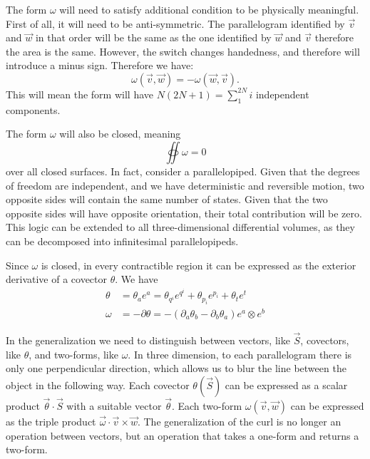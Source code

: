 \documentclass[10pt,twocolumn, nofootinbib]{revtex4-2}
\begin{document}
The form $\omega$ will need to satisfy additional condition to be physically meaningful. First of all, it will need to be anti-symmetric. The parallelogram identified by $\vec{v}$ and $\vec{w}$ in that order will be the same as the one identified by $\vec{w}$ and $\vec{v}$ therefore the area is the same. However, the switch changes handedness, and therefore will introduce a minus sign. Therefore we have:
\begin{equation}
	\omega(\vec{v}, \vec{w}) = - \omega(\vec{w}, \vec{v}).
\end{equation}
This will mean the form will have $N(2N+1) = \sum_1^{2N}i$ independent components.

The form $\omega$ will also be closed, meaning
\begin{equation}\label{mdof_closed_form}
	\oiint \omega = 0
\end{equation}
over all closed surfaces. In fact, consider a parallelopiped. Given that the degrees of freedom are independent, and we have deterministic and reversible motion, two opposite sides will contain the same number of states. Given that the two opposite sides will have opposite orientation, their total contribution will be zero. This logic can be extended to all three-dimensional differential volumes, as they can be decomposed into infinitesimal parallelopipeds.

Since $\omega$ is closed, in every contractible region it can be expressed as the exterior derivative of a covector $\theta$. We have
\begin{equation}
\begin{aligned}
	\theta &= \theta_a e^a = \theta_{q^i} e^{q^i} + \theta_{p_i} e^{p_i} + \theta_t e^t \\
	\omega &= - \partial \theta = - \left( \partial_a \theta_b - \partial_b \theta_a \right) e^a \otimes e^b
\end{aligned}
\end{equation}

In the generalization we need to distinguish between vectors, like $\vec{S}$, covectors, like $\theta$, and two-forms, like $\omega$. In three dimension, to each parallelogram there is only one perpendicular direction, which allows us to blur the line between the object in the following way. Each covector $\theta(\vec{S})$ can be expressed as a scalar product $\vec{\theta} \cdot \vec{S}$ with a suitable vector $\vec{\theta}$. Each two-form $\omega(\vec{v}, \vec{w})$ can be expressed as the triple product $\vec{\omega} \cdot \vec{v} \times \vec{w}$. The generalization of the curl is no longer an operation between vectors, but an operation that takes a one-form and returns a two-form.
\end{document}
